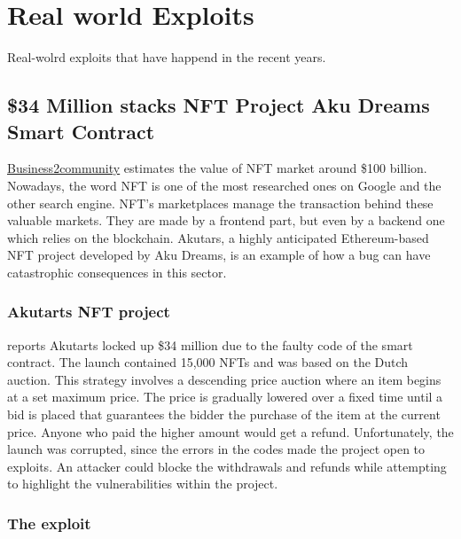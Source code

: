 \chapter{Real world Exploits}
\label{ch:Exploits}
Real-wolrd exploits that have happend in the recent years.

\section{\$34 Million stacks NFT Project Aku Dreams Smart Contract}
\label{sec:Exploits:AkuDreams}
\href{https://www.business2community.com/nft-news/nft-market-size-how-to-track-02467120}{Business2community} estimates the value of NFT market around \$100 billion.
Nowadays, the word NFT is one of the most researched ones on Google and the other search engine.
NFT's marketplaces manage the transaction behind these valuable markets. 
They are made by a frontend part, but even by a backend one which relies on the blockchain. 
Akutars, a highly anticipated Ethereum-based NFT project developed by Aku Dreams, is an example of how a bug can have catastrophic consequences in this sector. 
\subsection{Akutarts NFT project}
\label{sec:AkuDreams:Akutars}
\citet{AkuDreams} reports Akutarts locked up \$34 million due to the faulty code of the smart contract.
The launch contained 15,000  NFTs and was based on the Dutch auction. This strategy involves a descending price auction where an item begins at a set maximum price. 
The price is gradually lowered over a fixed time until a bid is placed that guarantees the bidder the purchase of the item at the current price. 
Anyone who paid the higher amount would get a refund.
Unfortunately, the launch was corrupted, since the errors in the codes made the project open to exploits. 
An attacker could blocke the withdrawals and refunds while attempting to highlight the vulnerabilities within the project.
\subsection{The exploit}
\label{sec:AkuDreams:AkutarsExploit}


